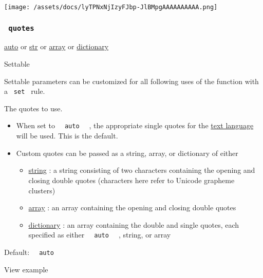 \texttt{[image: /assets/docs/lyTPNxNjIzyFJbp-JlBMpgAAAAAAAAAA.png]}

\subsubsection{\texorpdfstring{\texttt{\ quotes\ }}{ quotes }}\label{parameters-quotes}

\href{/docs/reference/foundations/auto/}{auto} {or}
\href{/docs/reference/foundations/str/}{str} {or}
\href{/docs/reference/foundations/array/}{array} {or}
\href{/docs/reference/foundations/dictionary/}{dictionary}

{{ Settable }}

\label{parameters-quotes-settable-tooltip}
Settable parameters can be customized for all following uses of the
function with a \texttt{\ set\ } rule.

The quotes to use.

\begin{itemize}
\tightlist
\item
  When set to \texttt{\ }{\texttt{\ auto\ }}\texttt{\ } , the
  appropriate single quotes for the
  \href{/docs/reference/text/text/\#parameters-lang}{text language} will
  be used. This is the default.
\item
  Custom quotes can be passed as a string, array, or dictionary of
  either

  \begin{itemize}
  \tightlist
  \item
    \href{/docs/reference/foundations/str/}{string} : a string
    consisting of two characters containing the opening and closing
    double quotes (characters here refer to Unicode grapheme clusters)
  \item
    \href{/docs/reference/foundations/array/}{array} : an array
    containing the opening and closing double quotes
  \item
    \href{/docs/reference/foundations/dictionary/}{dictionary} : an
    array containing the double and single quotes, each specified as
    either \texttt{\ }{\texttt{\ auto\ }}\texttt{\ } , string, or array
  \end{itemize}
\end{itemize}

Default: \texttt{\ }{\texttt{\ auto\ }}\texttt{\ }


View example

